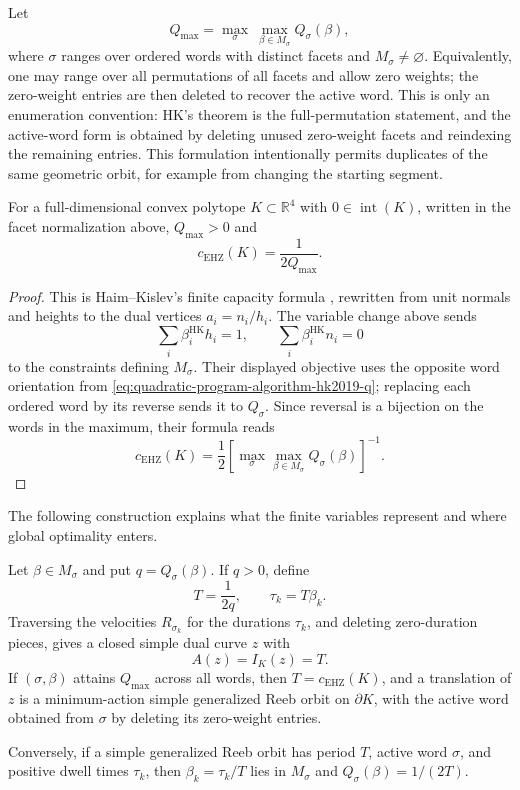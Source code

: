 Let
\[
  Q_{\max}
  =
  \max_\sigma\ \max_{\beta\in M_\sigma} Q_\sigma(\beta),
\]
where \(\sigma\) ranges over ordered words with distinct facets and
\(M_\sigma\ne\varnothing\). Equivalently,
one may range over all permutations of all facets and allow zero weights; the
zero-weight entries are then deleted to recover the active word. This is only
an enumeration convention: HK's theorem is the full-permutation statement, and
the active-word form is obtained by deleting unused zero-weight facets and
reindexing the remaining entries. This formulation intentionally permits
duplicates of the same geometric orbit, for example from changing the starting
segment.

\begin{theorem}
\label{thm:quadratic-program-algorithm-hk2019-hk-formula}
For a full-dimensional convex polytope \(K\subset\mathbb{R}^4\) with
\(0\in\operatorname{int}(K)\), written in the facet normalization above,
\(Q_{\max}>0\) and
\[
  c_{\mathrm{EHZ}}(K)=\frac{1}{2Q_{\max}}.
\]
\end{theorem}

\begin{proof}
This is Haim--Kislev's finite capacity formula
\cite[Theorem~1.1]{HK2017}, rewritten from unit normals and heights to the
dual vertices \(a_i=n_i/h_i\). The variable change above sends
\[
  \sum_i\beta_i^{\mathrm{HK}}h_i=1,\qquad
  \sum_i\beta_i^{\mathrm{HK}}n_i=0
\]
to the constraints defining \(M_\sigma\). Their displayed objective uses the
opposite word orientation from \eqref{eq:quadratic-program-algorithm-hk2019-q};
replacing each ordered word by its reverse sends it to \(Q_\sigma\). Since
reversal is a bijection on the words in the maximum, their formula reads
\[
  c_{\mathrm{EHZ}}(K)
  =
  \frac{1}{2}
  \left[\max_\sigma\max_{\beta\in M_\sigma}Q_\sigma(\beta)\right]^{-1}.
\]
\end{proof}

The following construction explains what the finite variables represent and
where global optimality enters.

\begin{proposition}
\label{prop:quadratic-program-global-maximizer-realization}
Let \(\beta\in M_\sigma\) and put \(q=Q_\sigma(\beta)\).  If \(q>0\), define
\[
  T=\frac{1}{2q},
  \qquad \tau_k=T\beta_k.
\]
Traversing the velocities \(R_{\sigma_k}\) for the durations \(\tau_k\), and
deleting zero-duration pieces, gives a closed simple dual curve \(z\) with
\[
  A(z)=I_K(z)=T.
\]
If \((\sigma,\beta)\) attains \(Q_{\max}\) across all words, then
\(T=c_{\mathrm{EHZ}}(K)\),
and a translation of \(z\) is a minimum-action simple generalized Reeb orbit
on \(\partial K\), with the active word obtained from \(\sigma\) by deleting
its zero-weight entries.

Conversely, if a simple generalized Reeb orbit has period \(T\), active word
\(\sigma\), and positive dwell times \(\tau_k\), then
\(\beta_k=\tau_k/T\) lies in \(M_\sigma\) and
\(Q_\sigma(\beta)=1/(2T)\).
\end{proposition}

